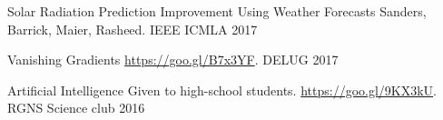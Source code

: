 
\begin{cvhonors}

\cvhonor
{Solar Radiation Prediction Improvement Using Weather Forecasts}
{Sanders, Barrick, Maier, Rasheed.}
{IEEE ICMLA}
{2017}

\end{cvhonors}


\begin{cvhonors}

\cvhonor
{Vanishing Gradients}
{\url{https://goo.gl/B7x3YF}.}
{DELUG}
{2017}

\cvhonor
{Artificial Intelligence}
{Given to high-school students. \url{https://goo.gl/9KX3kU}.}
{RGNS Science club}
{2016}

\end{cvhonors}

